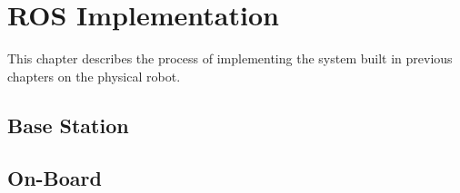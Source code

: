 \chapter{ROS Implementation} \label{chap:hardware}
This chapter describes the process of implementing the system built in previous chapters on the physical robot.

\section{Base Station}
\section{On-Board}